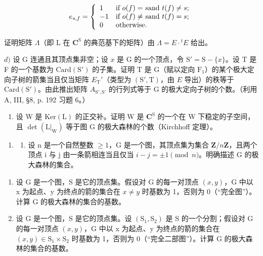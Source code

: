 \[
 e _ {s, f} = \left\{ \begin{array}{l l} 1 & \text {if } o (f) = s \text {and } t (f) \neq s; \\ - 1 & \text {if } o (f) \neq s \text {and } t (f) = s; \\ 0 & \text {otherwise. } \end{array} \right.
\]

证明矩阵 \(\Lambda\)（即 L 在 \(\mathbf{C}^{\mathrm{S}}\) 的典范基下的矩阵）由 \(\Lambda = E\cdot {}^{t}E\) 给出。

\(d)\) 设 G 连通且其顶点集非空；设 \(x\) 是 G 的一个顶点，令 \(\mathrm{S}' = \mathrm{S} - \{x\}\)。设 T 是 F 的一个基数为 \(\mathrm{Card}(\mathrm{S}')\) 的子集。证明 T 是 G（赋以定向 \(\mathrm{F}_1\)）的某个极大定向子树的箭集当且仅当矩阵 \(E_{\mathrm{T}}'\)（类型为 \((\mathrm{S}',\mathrm{T})\)，由 \(E\) 导出）的秩等于 \(\mathrm{Card}(\mathrm{S}')\)。由此推出矩阵 \(A_{\mathrm{S}',\mathrm{S}'}\) 的行列式等于 G 的极大定向子树的个数。（利用 A, III, §8, p. 192 习题 6。）

\begin{enumerate}
\def\labelenumi{\alph{enumi})}
\setcounter{enumi}{4}
\tightlist
\item
  设 W 是 \(\mathrm{Ker}(\mathrm{L})\) 的正交补。证明 W 是 \(\mathbf{C}^{\mathrm{S}}\) 的一个在 W 下稳定的子空间，且 \(\det (\mathrm{L}|_{\mathrm{W}})\) 等于图 G 的极大森林的个数（Kirchhoff 定理）。
\end{enumerate}

\begin{enumerate}
\def\labelenumi{\arabic{enumi})}
\setcounter{enumi}{4}
\tightlist
\item
  \begin{enumerate}
  \def\labelenumii{\alph{enumii})}
  \tightlist
  \item
    设 n 是一个自然整数 \(\geqslant 1\)，G 是一个图，其顶点集为集合 \(\mathbf{Z}/n\mathbf{Z}\)，且两个顶点 i 与 j 由一条箭相连当且仅当 \(i-j=\pm1\pmod n\)。明确描述 G 的极大森林的集合。
  \end{enumerate}
\end{enumerate}

\begin{enumerate}
\def\labelenumi{\alph{enumi})}
\setcounter{enumi}{1}
\item
  设 G 是一个图，S 是它的顶点集。假设对 G 的每一对顶点 \((x,y)\)，G 中以 x 为起点、y 为终点的箭的集合在 \(x \neq y\) 时基数为 1，否则为 0（“完全图”）。计算 G 的极大森林的集合的基数。
\item
  设 G 是一个图，S 是它的顶点集。设 \((\mathrm{S}_{1},\mathrm{S}_{2})\) 是 S 的一个分割；假设对 G 的每一对顶点 \((x,y)\)，G 中以 x 为起点、y 为终点的箭的集合在 \((x,y)\in\mathrm{S}_{1}\times\mathrm{S}_{2}\) 时基数为 1，否则为 0（“完全二部图”）。计算 G 的极大森林的集合的基数。
\end{enumerate}


